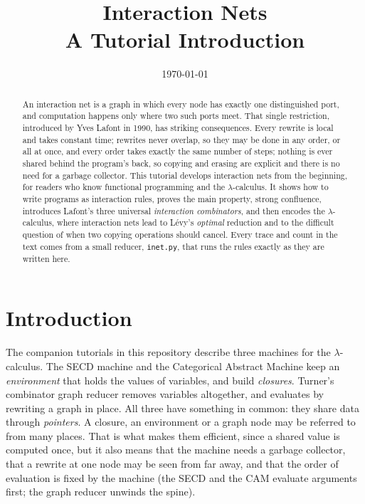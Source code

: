 \documentclass[11pt,a4paper]{article}
\title{\sffamily\bfseries Interaction Nets\\[4pt]
  \large\mdseries A Tutorial Introduction}
\author{}
\date{\today}
\theoremstyle{definition}
\theoremstyle{plain}
\begin{document}
\maketitle

\begin{abstract}
\noindent
An interaction net is a graph in which every node has exactly one
distinguished port, and computation happens only where two such ports meet.
That single restriction, introduced by Yves Lafont in 1990, has striking
consequences. Every rewrite is local and takes constant time; rewrites never
overlap, so they may be done in any order, or all at once, and every order
takes exactly the same number of steps; nothing is ever shared behind the
program's back, so copying and erasing are explicit and there is no need for
a garbage collector. This tutorial develops interaction nets from the
beginning, for readers who know functional programming and the
$\lambda$-calculus. It shows how to write programs as interaction rules, proves
the main property, strong confluence, introduces Lafont's three universal
\emph{interaction combinators}, and then encodes the $\lambda$-calculus,
where interaction nets lead to Lévy's \emph{optimal} reduction and to the
difficult question of when two copying operations should cancel. Every trace
and count in the text comes from a small reducer, \texttt{inet.py}, that runs
the rules exactly as they are written here.
\end{abstract}

\tableofcontents

\section{Introduction}

The companion tutorials in this repository describe three machines for the
$\lambda$-calculus. The SECD machine and the Categorical Abstract Machine keep
an \emph{environment} that holds the values of variables, and build
\emph{closures}. Turner's combinator graph reducer removes variables
altogether, and evaluates by rewriting a graph in place. All three have
something in common: they share data through \emph{pointers}. A closure, an
environment or a graph node may be referred to from many places. That is what
makes them efficient, since a shared value is computed once, but it also
means that the machine needs a garbage collector, that a rewrite at one node
may be seen from far away, and that the order of evaluation is fixed by the
machine (the SECD and the CAM evaluate arguments first; the graph reducer
unwinds the spine).
\end{document}
